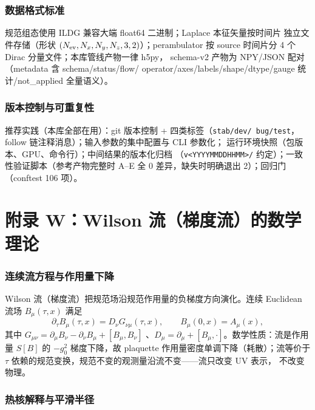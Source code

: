 \documentclass[11pt,a4paper]{ctexart}
\newcommand{\code}[1]{\texttt{#1}}
\begin{document}
\subsubsection{数据格式标准}

规范组态使用 ILDG 兼容大端 float64 二进制；Laplace 本征矢量按时间片
独立文件存储（形状 $(N_{\rm ev},N_x,N_y,N_z,3,2)$）；perambulator 按
source 时间片分 4 个 Dirac 分量文件；本库管线产物一律 h5py，
schema-v2 产物为 NPY/JSON 配对（metadata 含 schema/status/flow/
operator/axes/labels/shape/dtype/gauge 统计/not\_applied 全量语义）。

\subsubsection{版本控制与可重复性}

推荐实践（本库全部在用）：git 版本控制 + 四类标签（\code{stab/dev/
bug/test}，follow 链注释消息）；输入参数的集中配置与 CLI 参数化；
运行环境快照（包版本、GPU、命令行）；中间结果的版本化归档
（\code{v<YYYYMMDDHHMM>/} 约定）；一致性验证脚本（参考产物完整时
A--E 全 0 差异，缺失时明确退出 2）；回归门（conftest 106 项）。

\section{附录 W：Wilson 流（梯度流）的数学理论}

\subsubsection{连续流方程与作用量下降}

Wilson 流（梯度流）把规范场沿规范作用量的负梯度方向演化。连续
Euclidean 流场 $B_\mu(\tau,x)$ 满足
\begin{equation}
\partial_\tau B_\mu(\tau,x)=D_\nu G_{\nu\mu}(\tau,x),
\qquad B_\mu(0,x)=A_\mu(x),
\end{equation}
其中 $G_{\mu\nu}=\partial_\mu B_\nu-\partial_\nu B_\mu+[B_\mu,B_\nu]$
、$D_\mu=\partial_\mu+[B_\mu,\cdot]$。数学性质：流是作用量 $S[B]$ 的
$-g_0^2$ 梯度下降，故 plaquette 作用量密度单调下降（耗散）；流等价于
$\tau$ 依赖的规范变换，规范不变的观测量沿流不变——流只改变 UV 表示，
不改变物理。

\subsubsection{热核解释与平滑半径}
\end{document}
